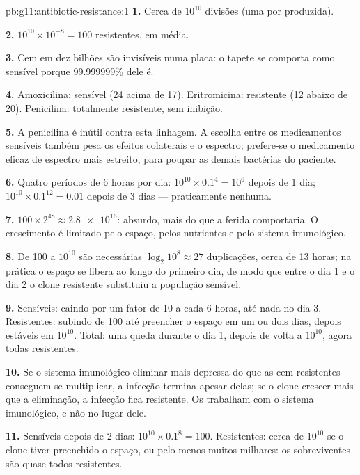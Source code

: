 \begin{solution}{pb:g11:antibiotic-resistance:1}
\textbf{1.} Cerca de $10^{10}$ divisões (uma por  produzida).

\textbf{2.} $10^{10} \times 10^{-8} = 100$  resistentes, em média.

\textbf{3.} Cem  em dez bilhões são invisíveis numa placa: o
tapete se comporta como sensível porque 99.999999\% dele é.

\textbf{4.} Amoxicilina: sensível (24 acima de 17). Eritromicina:
resistente (12 abaixo de 20). Penicilina: totalmente resistente, sem
inibição.

\textbf{5.} A penicilina é inútil contra esta linhagem. A escolha entre
os medicamentos sensíveis também pesa os efeitos colaterais e o
espectro; prefere-se o medicamento eficaz de espectro mais estreito,
para poupar as demais bactérias do paciente.

\textbf{6.} Quatro períodos de 6 horas por dia: $10^{10} \times 0.1^4 =
10^6$ depois de 1 dia; $10^{10} \times 0.1^{12} = 0.01$ depois de 3
dias --- praticamente nenhuma.

\textbf{7.} $100 \times 2^{48} \approx \num{2.8e16}$: absurdo, mais do
que a ferida comportaria. O crescimento é limitado pelo espaço, pelos
nutrientes e pelo sistema imunológico.

\textbf{8.} De 100  a $10^{10}$ são necessárias
$\log_2 10^8 \approx 27$ duplicações, cerca de 13 horas; na prática o
espaço se libera ao longo do primeiro dia, de modo que entre o dia 1 e
o dia 2 o clone resistente substituiu a população sensível.

\textbf{9.} Sensíveis: caindo por um fator de 10 a cada 6 horas, até
nada no dia 3. Resistentes: subindo de 100 até preencher o espaço em um
ou dois dias, depois estáveis em $10^{10}$. Total: uma queda durante o
dia 1, depois de volta a $10^{10}$, agora todas resistentes.

\textbf{10.} Se o sistema imunológico eliminar  mais depressa do
que as cem resistentes conseguem se multiplicar, a infecção termina
apesar delas; se o clone crescer mais que a eliminação, a infecção fica
resistente. Os  trabalham com o sistema imunológico, e não
no lugar dele.

\textbf{11.} Sensíveis depois de 2 dias: $10^{10} \times 0.1^8 = 100$.
Resistentes: cerca de $10^{10}$ se o clone tiver preenchido o espaço,
ou pelo menos muitos milhares: os sobreviventes são quase todos
resistentes.


\end{solution}
